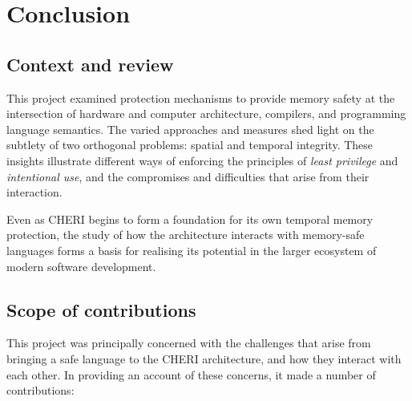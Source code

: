 \documentclass[dissertation.tex]{subfiles}
\begin{document}
\chapter{Conclusion}

\section{Context and review}

This project examined protection mechanisms to provide memory safety at
the intersection of hardware and computer architecture, compilers, and
programming language semantics.
The varied approaches and measures shed light on the subtlety of
two orthogonal problems: spatial and temporal integrity.
These insights illustrate different ways of enforcing the principles of
\emph{least privilege} and \emph{intentional use}, and the compromises
and difficulties that arise from their interaction.


Even as CHERI begins to form a foundation for its own temporal memory
protection, the study of how the architecture interacts with memory-safe
languages forms a basis for realising its potential in the larger
ecosystem of modern software development.


\section{Scope of contributions}

This project was principally concerned with the challenges that arise
from bringing a safe language to the CHERI architecture, and how they
interact with each other.
In providing an account of these concerns, it made a number of
contributions:

\end{document}
